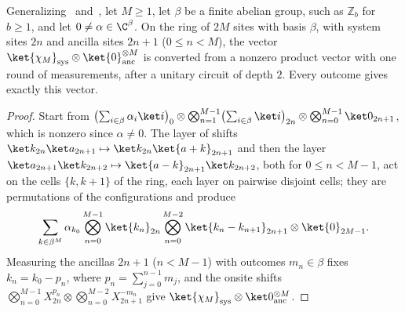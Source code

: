 \begin{theorem}
    \label{thm:ghz_measurement}
    \leanok
    Generalizing~\cite[Example~1]{Piroli2021LOCC}
    and~\cite[paragraph ``Long-range MPS using measurements'']{Malz2024Preparation}, let
    $M\geq1$, let $\beta$ be a finite abelian group, such as $\mathbb Z_b$ for $b\geq1$, and let
    $0\neq\alpha\in\C^\beta$. On the ring of $2M$ sites with basis $\beta$, with system sites
    $2n$ and ancilla sites $2n+1$ ($0\le n<M$), the vector
    $\ket{\chi_M}_{\rm sys}\otimes\ket{0}^{\otimes M}_{\rm anc}$ is converted from a nonzero
    product vector with one round of measurements, after a unitary circuit of depth $2$.
    Every outcome gives exactly this vector.
\end{theorem}
\begin{proof}
    \leanok
    Start from
    $\bigl(\sum_{i\in\beta}\alpha_i\ket i\bigr)_0\otimes\bigotimes_{n=1}^{M-1}
    \bigl(\sum_{i\in\beta}\ket i\bigr)_{2n}\otimes\bigotimes_{n=0}^{M-1}\ket 0_{2n+1}$, which
    is nonzero since $\alpha\neq0$. The layer of shifts
    $\ket k_{2n}\ket a_{2n+1}\mapsto\ket k_{2n}\ket{a+k}_{2n+1}$ and then the layer
    $\ket a_{2n+1}\ket k_{2n+2}\mapsto\ket{a-k}_{2n+1}\ket k_{2n+2}$, both for $0\le n<M-1$,
    act on the cells $\{k,k+1\}$ of the ring, each layer on pairwise disjoint cells; they are
    permutations of the configurations and produce
    \begin{align}
        \sum_{k\in\beta^M}\alpha_{k_0}\bigotimes_{n=0}^{M-1}\ket{k_n}_{2n}
        \bigotimes_{n=0}^{M-2}\ket{k_n-k_{n+1}}_{2n+1}\otimes\ket{0}_{2M-1}.\notag
    \end{align}
    Measuring the ancillas $2n+1$ ($n<M-1$) with outcomes $m_n\in\beta$ fixes $k_n=k_0-p_n$,
    where $p_n=\sum_{j=0}^{n-1}m_j$, and the onsite shifts
    $\bigotimes_{n=0}^{M-1}X^{p_n}_{2n}\otimes\bigotimes_{n=0}^{M-2}X^{-m_n}_{2n+1}$ give
    $\ket{\chi_M}_{\rm sys}\otimes\ket 0^{\otimes M}_{\rm anc}$.
\end{proof}

